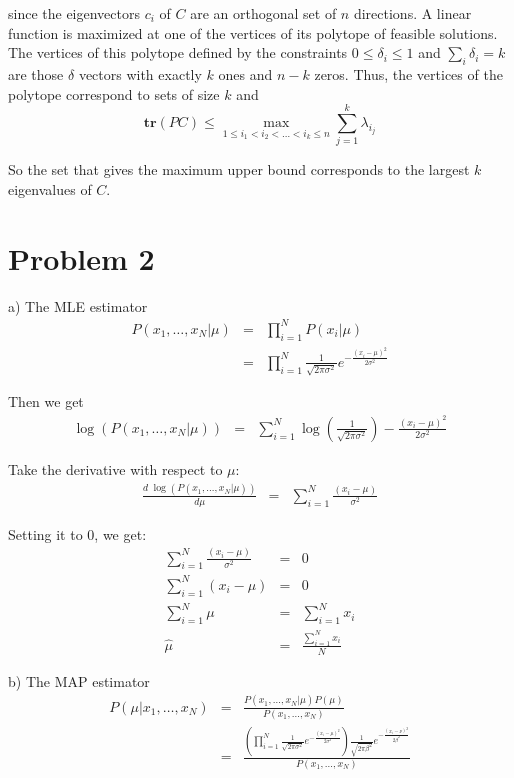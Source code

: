 \documentclass[12pt]{article}
\begin{document}
since the eigenvectors $c_i$ of $C$ are an orthogonal set of $n$ directions. A linear function is maximized at one of the vertices of its polytope of feasible solutions. The vertices of this polytope defined by the constraints $0 \le \delta_i \le 1$ and $\sum_i \delta_i = k$ are those $\delta$ vectors with exactly $k$ ones and $n-k$ zeros. Thus, the vertices of the polytope correspond to sets of size $k$ and
\begin{equation*}
  \textbf{tr}(PC) \le \max_{1 \le i_1 < i_2 < \dots < i_k \le n}
  \sum_{j=1}^k \lambda_{i_j}
\end{equation*}

So the set that gives the maximum upper bound corresponds to the largest $k$ eigenvalues of $C$.

\section*{Problem 2}

a) The MLE estimator
\begin{eqnarray*}
  P(x_1, \dots, x_N | \mu)
  &=& \prod_{i=1}^N P(x_i | \mu) \\
  &=& \prod_{i=1}^N \frac {1}{\sqrt {2 \pi \sigma^2}}
      e^{-\frac {(x_i - \mu)^2}{2 \sigma^2}}
\end{eqnarray*}

Then we get
\begin{eqnarray*}
  \log (P(x_1, \dots, x_N | \mu))
  &=& \sum_{i=1}^N \log \left( \frac {1}{\sqrt {2 \pi \sigma^2}} \right)
      - \frac {(x_i - \mu)^2}{2 \sigma^2}
\end{eqnarray*}

Take the derivative with respect to $\mu$:
\begin{eqnarray*}
  \frac {d \; \log (P(x_1, \dots, x_N | \mu))}{d \mu}
  &=& \sum_{i=1}^N \frac {(x_i - \mu)}{\sigma^2}
\end{eqnarray*}

Setting it to 0, we get:
\begin{eqnarray*}
  \sum_{i=1}^N \frac {(x_i - \mu)}{\sigma^2} &=& 0 \\
  \sum_{i=1}^N (x_i - \mu) &=& 0 \\
  \sum_{i=1}^N \mu &=& \sum_{i=1}^N x_i \\
  \hat {\mu} &=& \frac {\sum_{i=1}^N x_i}{N}
\end{eqnarray*}

b) The MAP estimator
\begin{eqnarray*}
  P(\mu | x_1, \dots, x_N )
  &=& \frac {P(x_1, \dots, x_N | \mu) P(\mu)}{P(x_1, \dots, x_N)} \\
  &=& \frac {\left( \prod_{i=1}^N \frac {1}{\sqrt{2 \pi \sigma^2}}
      e^{-\frac {(x_i - \mu)^2}{2 \sigma^2}} \right) \frac{1}{\sqrt{2 \pi \beta^2}}
      e^{-\frac {(x_i - \nu)^2}{2 \beta^2}}}  {P(x_1, \dots, x_N)} \\
\end{eqnarray*}
\end{document}
